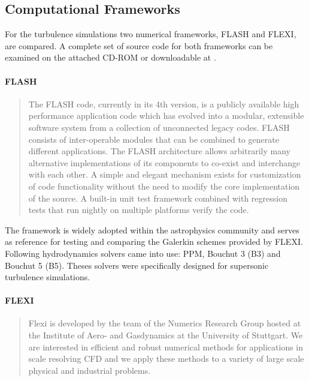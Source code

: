 \subsection{Computational Frameworks}
\label{sec:computational-frameworks}

For the turbulence simulations two numerical frameworks, FLASH and FLEXI, are
compared. A complete set of source code for both frameworks can be examined on
the attached CD-ROM or downloadable at \cite{}.

\paragraph{FLASH}
\begin{quote}
The FLASH code, currently in its 4th version, is a publicly available high
performance application code which has evolved into a modular, extensible
software system from a collection of unconnected legacy codes. FLASH consists
of inter-operable modules that can be combined to generate different
applications. The FLASH architecture allows arbitrarily many alternative
implementations of its components to co-exist and interchange with each other.
A simple and elegant mechanism exists for customization of code functionality
without the need to modify the core implementation of the source. A built-in
unit test framework combined with regression tests that run nightly on multiple
platforms verify the code. 
\end{quote}

The framework is widely adopted within the astrophysics community and serves as
reference for testing and comparing the Galerkin schemes provided by FLEXI.
Following hydrodynamics solvers came into use: PPM, Bouchut 3 (B3) and Bouchut 5
(B5). Theses solvers were specifically designed for supersonic turbulence
simulations.

\paragraph{FLEXI}
\begin{quote}
Flexi is developed by the team of the Numerics Research Group hosted at the
Institute of Aero- and Gasdynamics at the University of Stuttgart. We are
interested in efficient and robust numerical methods for applications in scale
resolving CFD and we apply these methods to a variety of large scale
physical and industrial problems.
\end{quote}

